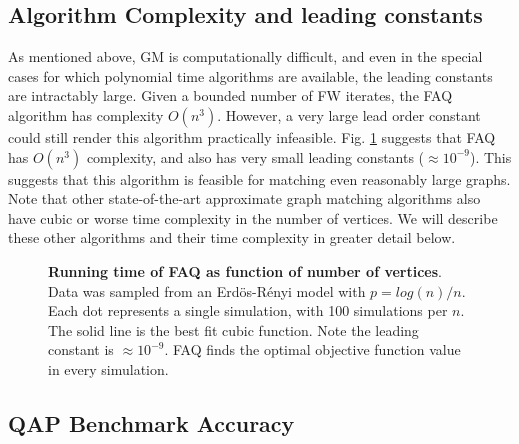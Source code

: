 \documentclass[10pt]{article}
\begin{document}
\subsection{Algorithm Complexity and leading constants} %
\label{sub:const}

As mentioned above, GM is computationally difficult, and even in the special cases for which polynomial time algorithms are available, the leading constants are intractably large. Given a bounded number of FW iterates, the FAQ algorithm has complexity $O(n^3)$.  However, a very large lead order constant could still render this algorithm practically infeasible.  
Fig. \ref{fig:scaling} suggests that FAQ has $O(n^3)$ complexity, and also has very small leading constants ($\approx 10^{-9}$). 
This suggests that this algorithm is feasible for matching even reasonably large graphs.  Note that other state-of-the-art approximate graph matching algorithms also have cubic or worse time complexity in the number of vertices.  We will describe these other algorithms and their time complexity in greater detail below.

\begin{figure}[htbp]
	\centering			
	\caption{{\bf Running time of FAQ as function of number of vertices}. Data was sampled from an Erd\"os-R\'enyi model with $p=log(n)/n$.  Each dot represents a single simulation, with 100 simulations per $n$.  The solid line is the best fit cubic function.  Note the leading constant is $\approx 10^{-9}$. FAQ finds the optimal objective function value in every simulation.}
	\label{fig:scaling}
\end{figure}


\subsection{QAP Benchmark Accuracy} 
\label{sub:qap_benchmarks}
\end{document}
